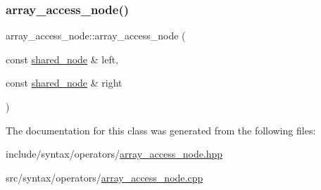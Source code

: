 \subsubsection{\texorpdfstring{array\+\_\+access\+\_\+node()}{array\_access\_node()}}
{\footnotesize\ttfamily array\+\_\+access\+\_\+node\+::array\+\_\+access\+\_\+node (\begin{DoxyParamCaption}\item[{const \hyperlink{namespacejawe_a3f307481d921b6cbb50cc8511fc2b544}{shared\+\_\+node} \&}]{left,  }\item[{const \hyperlink{namespacejawe_a3f307481d921b6cbb50cc8511fc2b544}{shared\+\_\+node} \&}]{right }\end{DoxyParamCaption})}



The documentation for this class was generated from the following files\+:\begin{DoxyCompactItemize}
\item 
include/syntax/operators/\hyperlink{array__access__node_8hpp}{array\+\_\+access\+\_\+node.\+hpp}\item 
src/syntax/operators/\hyperlink{array__access__node_8cpp}{array\+\_\+access\+\_\+node.\+cpp}\end{DoxyCompactItemize}
